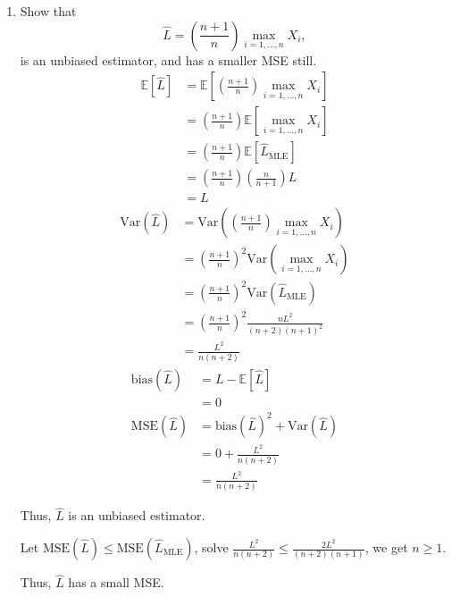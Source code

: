 \documentclass[letter, 12pt]{article}
\begin{document}
\begin{enumerate}[wide = 0pt, label = \arabic*)]
		\item {Show that
		\begin{equation}
			\hat{L} = (\frac{n+1}{n})\max_{i=1,\dots,n}X_i,
		\end{equation}
		is an unbiased estimator, and has a smaller MSE still.}
		\begin{align*}
			\mathbb{E}[\hat{L}] &= \mathbb{E}[(\frac{n+1}{n})\max_{i=1,\dots,n}X_i] \\
			&= (\frac{n+1}{n})\mathbb{E}[\max_{i=1,\dots,n}X_i] \\
			&= (\frac{n+1}{n})\mathbb{E}[\hat{L}_{\text{MLE}}] \\
			&= (\frac{n+1}{n}) (\frac{n}{n+1})L \\
			&= L 
		\end{align*}
		\begin{align*}
			\text{Var}(\hat{L}) &= \text{Var}((\frac{n+1}{n})\max_{i=1,\dots,n}X_i) \\
			&= (\frac{n+1}{n})^2 \text{Var}(\max_{i=1,\dots,n}X_i) \\
			&= (\frac{n+1}{n})^2 \text{Var}(\hat{L}_{\text{MLE}}) \\
			&= (\frac{n+1}{n})^2 \frac{n L^2}{(n+2)(n+1)^2} \\
			&= \frac{L^2}{n(n+2)} 
		\end{align*}
		\begin{align*}
			\text{bias}(\hat{L}) &= L - \mathbb{E}[\hat{L}] \\
			&= 0 \\
			\text{MSE}(\hat{L}) &= \text{bias}(\hat{L})^2 + \text{Var}(\hat{L}) \\
			&= 0 + \frac{L^2}{n(n+2)} \\
			&= \frac{L^2}{n(n+2)} 
		\end{align*}
		\par{Thus, $ \hat{L} $ is an unbiased estimator.}
		\par{Let $ \text{MSE}(\hat{L}) \le \text{MSE}(\hat{L}_{\text{MLE}}) $, solve $ \frac{L^2}{n(n+2)} \le \frac{2 L^2}{(n+2)(n+1)} $, we get $ n \ge 1 $.}
		\par{Thus, $ \hat{L} $ has a small MSE.}
	\end{enumerate}
\end{document}
